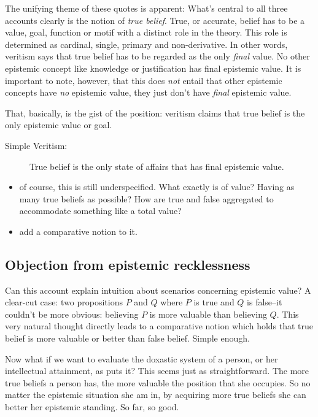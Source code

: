 \documentclass[12pt,numbers=noenddot]{scrartcl}
\begin{document}
The unifying theme of these quotes is apparent: What’s central to all three accounts clearly is the notion of \emph{true belief}. True, or accurate, belief has to be a value, goal, function or motif with a distinct role in the theory. This role is determined as cardinal, single, primary and non-derivative. In other words, veritism says that true belief has to be regarded as the only \emph{final} value. No other epistemic concept like knowledge or justification has final epistemic value. It is important to note, however, that this does \emph{not} entail that other epistemic concepts have \emph{no} epistemic value, they just don’t have \emph{final} epistemic value.

That, basically, is the gist of the position: veritism claims that true belief is the only epistemic value or goal. 

\begin{description}
    \item[Simple Veritism:] True belief is the only state of affairs that has final epistemic value.
\end{description}

\begin{itemize}
    \item of course, this is still underspecified. What exactly is of value? Having as many true beliefs as possible? How are true and false aggregated to accommodate something like a total value?
    \item add a comparative notion to it.
\end{itemize}

\subsection{Objection from epistemic recklessness}

Can this account explain intuition about scenarios concerning epistemic value?  A clear-cut case: two propositions $P$ and $Q$ where $P$ is true and $Q$ is false--it couldn't be more obvious: believing $P$ is more valuable than believing $Q$. This very natural thought directly leads to a comparative notion which holds that true belief is more valuable or better than false belief. Simple enough.

Now what if we want to evaluate the doxastic system of a person, or her intellectual attainment, as \textcite[12]{Goldman2002-GOLTUO-2} puts it? This seems just as straightforward. The more true beliefs a person has, the more valuable the position that she occupies. So no matter the epistemic situation she am in, by acquiring more true beliefs she can better her epistemic standing. So far, so good.
\end{document}
